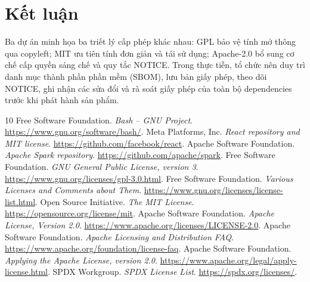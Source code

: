\documentclass[12pt,a4paper]{article}
\begin{document}
\section{Kết luận}
Ba dự án minh họa ba triết lý cấp phép khác nhau: GPL bảo vệ tính mở thông qua copyleft; MIT ưu tiên tính đơn giản và tái sử dụng; Apache-2.0 bổ sung cơ chế cấp quyền sáng chế và quy tắc NOTICE. Trong thực tiễn, tổ chức nên duy trì danh mục thành phần phần mềm (SBOM), lưu bản giấy phép, theo dõi NOTICE, ghi nhận các sửa đổi và rà soát giấy phép của toàn bộ dependencies trước khi phát hành sản phẩm.

\begin{thebibliography}{10}
 Free Software Foundation. \textit{Bash -- GNU Project}. \url{https://www.gnu.org/software/bash/}.
 Meta Platforms, Inc. \textit{React repository and MIT license}. \url{https://github.com/facebook/react}.
 Apache Software Foundation. \textit{Apache Spark repository}. \url{https://github.com/apache/spark}.
 Free Software Foundation. \textit{GNU General Public License, version 3}. \url{https://www.gnu.org/licenses/gpl-3.0.html}.
 Free Software Foundation. \textit{Various Licenses and Comments about Them}. \url{https://www.gnu.org/licenses/license-list.html}.
 Open Source Initiative. \textit{The MIT License}. \url{https://opensource.org/license/mit}.
 Apache Software Foundation. \textit{Apache License, Version 2.0}. \url{https://www.apache.org/licenses/LICENSE-2.0}.
 Apache Software Foundation. \textit{Apache Licensing and Distribution FAQ}. \url{https://www.apache.org/foundation/license-faq}.
 Apache Software Foundation. \textit{Applying the Apache License, version 2.0}. \url{https://www.apache.org/legal/apply-license.html}.
 SPDX Workgroup. \textit{SPDX License List}. \url{https://spdx.org/licenses/}.
\end{thebibliography}
\end{document}
